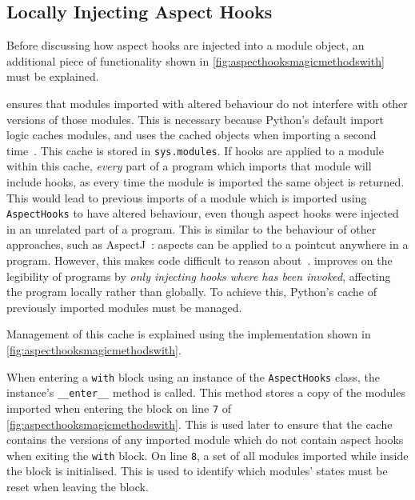 \subsection{Locally Injecting Aspect Hooks}
\label{local_aspect_hook_effects}

Before discussing how aspect hooks are injected into a module object, an
additional piece of functionality shown in
\cref{fig:aspecthooksmagicmethodswith} must be explained.

\pdsf{} ensures that modules imported with altered behaviour do not interfere
with other versions of those modules. This is necessary because Python's default
import logic caches modules, and uses the cached objects when importing a second
time~\cite{python_import_cache_definition}. This cache is stored in
\lstinline{sys.modules}. If hooks are applied to a module within this cache,
\emph{every} part of a program which imports that module will include hooks, as
every time the module is imported the same object is returned. This would lead
to previous imports of a module which is imported using \lstinline{AspectHooks}
to have altered behaviour, even though aspect hooks were injected in an
unrelated part of a program. This is similar to the behaviour of other \aop{}
approaches, such as AspectJ~\cite{AspectJLanguageAndTools}: aspects can be
applied to a pointcut anywhere in a program. However, this makes code difficult
to reason about~\cite{steimann06paradoxical,przybylek2010wrong}. \pdsf{}
improves on the legibility of \aspectoriented programs by \emph{only injecting
hooks where \pdsf{} has been invoked}, affecting the program locally rather than
globally. To achieve this, Python's cache of previously imported modules must be
managed.

Management of this cache is explained using the implementation shown in
\cref{fig:aspecthooksmagicmethodswith}.

When entering a \lstinline{with} block using an instance of the
\lstinline{AspectHooks} class, the instance's \lstinline{__enter__} method is
called. This method stores a copy of the modules imported when entering the
block on line \texttt{7} of \cref{fig:aspecthooksmagicmethodswith}. This is used
later to ensure that the cache contains the versions of any imported module
which do not contain aspect hooks when exiting the \lstinline{with} block. On
line \texttt{8}, a set of all modules imported while inside the block is
initialised. This is used to identify which modules' states must be reset when
leaving the block.

